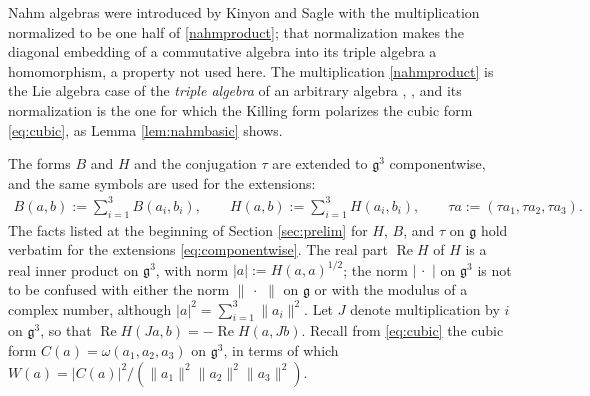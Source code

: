 \documentclass [leqno, 10pt]{amsart}
\theoremstyle{definition}
\numberwithin{equation}{section}
\newcommand{\om}{\omega}
\newcommand{\dum}{\,\cdot\,\,}
\newcommand{\re}{\operatorname{Re}}
\newcommand{\g}{\mathfrak{g}}
\newcommand{\norm}[1]{\lVert #1\rVert}
\newcommand{\nnorm}[1]{\lvert #1\rvert}%
\begin{document}
Nahm algebras were introduced by Kinyon and Sagle \cite{Kinyon-Sagle} with the multiplication normalized to be one half of \eqref{nahmproduct}; that normalization makes the diagonal embedding of a commutative algebra into its triple algebra a homomorphism, a property not used here. The multiplication \eqref{nahmproduct} is the Lie algebra case of the \emph{triple algebra} of an arbitrary algebra \cite[Section~11]{Fox-trace}, \cite{Fox-cubicpoly, Fox-Tkachev}, and its normalization is the one for which the Killing form polarizes the cubic form \eqref{eq:cubic}, as Lemma \ref{lem:nahmbasic} shows.

The forms $B$ and $H$ and the conjugation $\tau$ are extended to $\g^{3}$ componentwise, and the same symbols are used for the extensions:
\begin{align}\label{eq:componentwise}
B(a,b):=\sum_{i=1}^3B(a_i,b_i), \qquad H(a,b):=\sum_{i=1}^3H(a_i,b_i), \qquad \tau a:=(\tau a_1,\tau a_2,\tau a_3).
\end{align}
The facts listed at the beginning of Section \ref{sec:prelim} for $H$, $B$, and $\tau$ on $\g$ hold verbatim for the extensions \eqref{eq:componentwise}. 
The real part $\re H$ of $H$ is a real inner product on $\g^{3}$, with norm $\nnorm{a}:=H(a,a)^{1/2}$; the norm $\nnorm{\dum}$ on $\g^{3}$ is not to be confused with either the norm $\norm{\dum}$ on $\g$ or with the modulus of a complex number, although $\nnorm{a}^{2} = \sum_{i=1}^{3}\norm{a_{i}}^{2}$. Let $J$ denote multiplication by $i$ on $\g^{3}$, so that $\re H(Ja, b) = -\re H(a, Jb)$. Recall from \eqref{eq:cubic} the cubic form $C(a) = \om(a_{1}, a_{2}, a_{3})$ on $\g^{3}$, in terms of which $W(a) = |C(a)|^{2}/(\norm{a_{1}}^{2}\norm{a_{2}}^{2}\norm{a_{3}}^{2})$.
\end{document}
